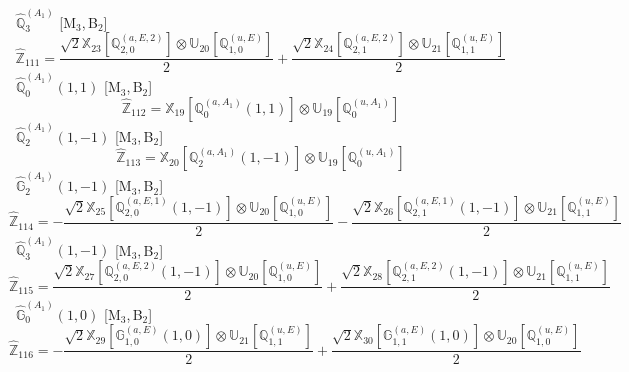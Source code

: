 \documentclass[fleqn,10pt,landscape]{article}
\begin{document}
\begin{itemize}
\noindent {} $\,\,\,\hat{\mathbb{Q}}_{3}^{(A_{1})}$ [M$_{3}$,\,B$_{2}$]
\begin{dmath*}
\hat{\mathbb{Z}}_{111}=\frac{\sqrt{2} \mathbb{X}_{23}[\mathbb{Q}_{2,0}^{(a,E,2)}] \otimes\mathbb{U}_{20}[\mathbb{Q}_{1,0}^{(u,E)}]}{2} + \frac{\sqrt{2} \mathbb{X}_{24}[\mathbb{Q}_{2,1}^{(a,E,2)}] \otimes\mathbb{U}_{21}[\mathbb{Q}_{1,1}^{(u,E)}]}{2}
\end{dmath*}
\vspace{4mm}
\noindent {} $\,\,\,\hat{\mathbb{Q}}_{0}^{(A_{1})}(1,1)$ [M$_{3}$,\,B$_{2}$]
\begin{dmath*}
\hat{\mathbb{Z}}_{112}=\mathbb{X}_{19}[\mathbb{Q}_{0}^{(a,A_{1})}(1,1)] \otimes\mathbb{U}_{19}[\mathbb{Q}_{0}^{(u,A_{1})}]
\end{dmath*}
\vspace{4mm}
\noindent {} $\,\,\,\hat{\mathbb{Q}}_{2}^{(A_{1})}(1,-1)$ [M$_{3}$,\,B$_{2}$]
\begin{dmath*}
\hat{\mathbb{Z}}_{113}=\mathbb{X}_{20}[\mathbb{Q}_{2}^{(a,A_{1})}(1,-1)] \otimes\mathbb{U}_{19}[\mathbb{Q}_{0}^{(u,A_{1})}]
\end{dmath*}
\vspace{4mm}
\noindent {} $\,\,\,\hat{\mathbb{G}}_{2}^{(A_{1})}(1,-1)$ [M$_{3}$,\,B$_{2}$]
\begin{dmath*}
\hat{\mathbb{Z}}_{114}=- \frac{\sqrt{2} \mathbb{X}_{25}[\mathbb{Q}_{2,0}^{(a,E,1)}(1,-1)] \otimes\mathbb{U}_{20}[\mathbb{Q}_{1,0}^{(u,E)}]}{2} - \frac{\sqrt{2} \mathbb{X}_{26}[\mathbb{Q}_{2,1}^{(a,E,1)}(1,-1)] \otimes\mathbb{U}_{21}[\mathbb{Q}_{1,1}^{(u,E)}]}{2}
\end{dmath*}
\vspace{4mm}
\noindent {} $\,\,\,\hat{\mathbb{Q}}_{3}^{(A_{1})}(1,-1)$ [M$_{3}$,\,B$_{2}$]
\begin{dmath*}
\hat{\mathbb{Z}}_{115}=\frac{\sqrt{2} \mathbb{X}_{27}[\mathbb{Q}_{2,0}^{(a,E,2)}(1,-1)] \otimes\mathbb{U}_{20}[\mathbb{Q}_{1,0}^{(u,E)}]}{2} + \frac{\sqrt{2} \mathbb{X}_{28}[\mathbb{Q}_{2,1}^{(a,E,2)}(1,-1)] \otimes\mathbb{U}_{21}[\mathbb{Q}_{1,1}^{(u,E)}]}{2}
\end{dmath*}
\vspace{4mm}
\noindent {} $\,\,\,\hat{\mathbb{G}}_{0}^{(A_{1})}(1,0)$ [M$_{3}$,\,B$_{2}$]
\begin{dmath*}
\hat{\mathbb{Z}}_{116}=- \frac{\sqrt{2} \mathbb{X}_{29}[\mathbb{G}_{1,0}^{(a,E)}(1,0)] \otimes\mathbb{U}_{21}[\mathbb{Q}_{1,1}^{(u,E)}]}{2} + \frac{\sqrt{2} \mathbb{X}_{30}[\mathbb{G}_{1,1}^{(a,E)}(1,0)] \otimes\mathbb{U}_{20}[\mathbb{Q}_{1,0}^{(u,E)}]}{2}

\end{dmath*}
\end{itemize}
\end{document}
